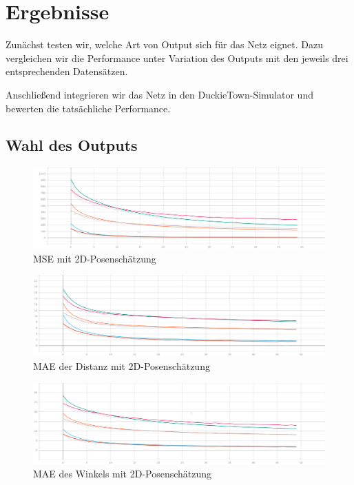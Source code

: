 \chapter{Ergebnisse}

Zunächst testen wir, welche Art von Output sich für das Netz eignet. Dazu vergleichen wir die Performance unter Variation des Outputs mit den jeweils drei entsprechenden Datensätzen.

Anschließend integrieren wir das Netz in den DuckieTown-Simulator und bewerten die tatsächliche Performance.

\section{Wahl des Outputs}

\begin{figure}[H]
	\centering
	\includegraphics[width=\linewidth]{kapitel5/images//single-loss/Loss-single-loss.png}
	\caption{MSE mit 2D-Posenschätzung}
	\label{2d-poses-mse}
\end{figure}

\begin{figure}[H]
	\centering
	\includegraphics[width=\linewidth]{kapitel5/images/single-loss/Mean_Abs_Error_d-single-loss.png}
	\caption{MAE der Distanz mit 2D-Posenschätzung}
	\label{2d-poses-mae-d}
\end{figure}

\begin{figure}[H]
	\centering
	\includegraphics[width=\linewidth]{kapitel5/images/single-loss/Mean_Abs_Error_a-single-loss.png}
	\caption{MAE des Winkels mit 2D-Posenschätzung}
	\label{2d-poses-mae-a}
\end{figure}



